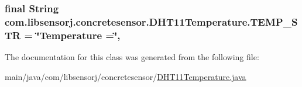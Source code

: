 \subsubsection[{T\+E\+M\+P\+\_\+\+S\+T\+R}]{\setlength{\rightskip}{0pt plus 5cm}final String com.\+libsensorj.\+concretesensor.\+D\+H\+T11\+Temperature.\+T\+E\+M\+P\+\_\+\+S\+T\+R = \char`\"{}Temperature =\char`\"{}\hspace{0.3cm}{\ttfamily [static]}, {\ttfamily [private]}}\label{classcom_1_1libsensorj_1_1concretesensor_1_1DHT11Temperature_a123ae6845e0cc1d1ec859cf7cfb78004}


The documentation for this class was generated from the following file\+:\begin{DoxyCompactItemize}
\item 
main/java/com/libsensorj/concretesensor/\hyperlink{DHT11Temperature_8java}{D\+H\+T11\+Temperature.\+java}\end{DoxyCompactItemize}
